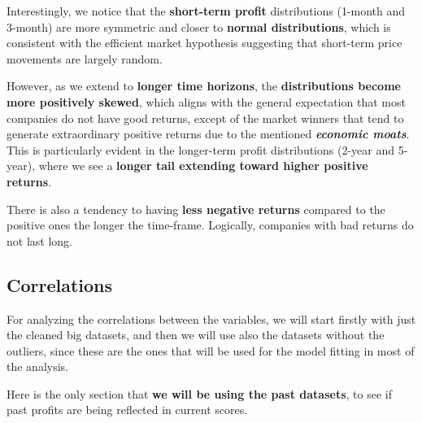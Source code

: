\documentclass[11pt,english,a4paper,hidelinks]{book}
\begin{document}
\noindent Interestingly, we notice that the \textbf{short-term profit} distributions (1-month and 3-month) are more symmetric and closer to \textbf{normal distributions}, which is consistent with the efficient market hypothesis suggesting that short-term price movements are largely random. 

\vspace{0.5cm}
\noindent However, as we extend to \textbf{longer time horizons}, the \textbf{distributions become more positively skewed}, which aligns with the general expectation that most companies do not have good returns, except of the market winners that tend to generate extraordinary positive returns due to the mentioned \textbf{\textit{economic moats}}. This is particularly evident in the longer-term profit distributions (2-year and 5-year), where we see a \textbf{longer tail extending toward higher positive returns}.


\vspace{0.5cm}
\noindent There is also a tendency to having \textbf{less negative returns} compared to the positive ones the longer the time-frame. Logically, companies with bad returns do not last long.

\subsection{Correlations}

For analyzing the correlations between the variables, we will start firstly with just the cleaned big datasets, and then we will use also the datasets without the outliers, since these are the ones that will be used for the model fitting in most of the analysis.

\vspace{0.5cm}
\noindent Here is the only section that \textbf{we will be using the past datasets}, to see if past profits are being reflected in current scores.
\end{document}
